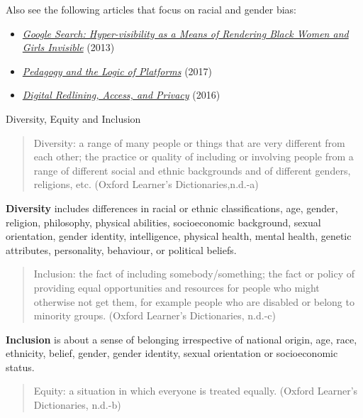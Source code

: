 \documentclass[
  letterpaper,
  DIV=11,
  numbers=noendperiod]{scrreprt}
\providecommand{\tightlist}{%
  \setlength{\itemsep}{0pt}\setlength{\parskip}{0pt}}\usepackage{longtable,booktabs,array}
\begin{document}
\begin{tcolorbox}
Also see the following articles that focus on racial and gender bias:

\begin{itemize}
\tightlist
\item
  \href{http://ivc.lib.rochester.edu/google-search-hyper-visibility-as-a-means-of-rendering-black-women-and-girls-invisible/}{\emph{Google
  Search: Hyper-visibility as a Means of Rendering Black Women and Girls
  Invisible}} (2013)
\item
  \href{https://er.educause.edu/articles/2017/7/pedagogy-and-the-logic-of-platforms}{\emph{Pedagogy
  and the Logic of Platforms}} (2017)
\item
  \href{https://www.commonsense.org/education/articles/digital-redlining-access-and-privacy}{\emph{Digital
  Redlining, Access, and Privacy}} (2016)
\end{itemize}

\end{tcolorbox}

Diversity, Equity and Inclusion

\label{diversity}
\begin{quote}
Diversity: a range of many people or things that are very different from
each other; the practice or quality of including or involving people
from a range of different social and ethnic backgrounds and of different
genders, religions, etc. (Oxford Learner's Dictionaries,n.d.-a)
\end{quote}

\textbf{Diversity} includes differences in racial or ethnic
classifications, age, gender, religion, philosophy, physical abilities,
socioeconomic background, sexual orientation, gender identity,
intelligence, physical health, mental health, genetic attributes,
personality, behaviour, or political beliefs.

\label{inclusion}
\begin{quote}
Inclusion: the fact of including somebody/something; the fact or policy
of providing equal opportunities and resources for people who might
otherwise not get them, for example people who are disabled or belong to
minority groups. (Oxford Learner's Dictionaries, n.d.-c)
\end{quote}

\textbf{Inclusion} is about a sense of belonging irrespective of
national origin, age, race, ethnicity, belief, gender, gender identity,
sexual orientation or socioeconomic status.

\label{equity}
\begin{quote}
Equity: a situation in which everyone is treated equally. (Oxford
Learner's Dictionaries, n.d.-b)
\end{quote}
\end{document}
